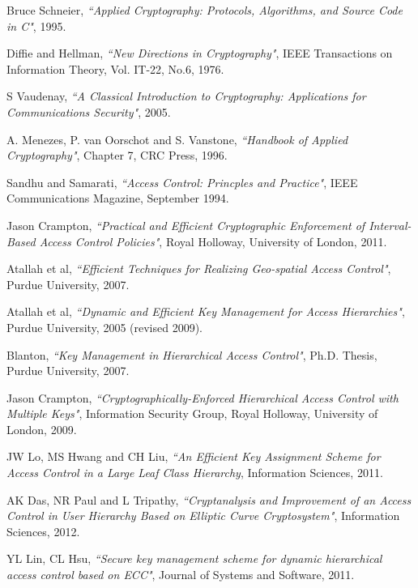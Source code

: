 \documentclass[12pt, titlepage]{article}
\begin{document}
\begin{thebibliography}{10}

Bruce Schneier, \emph{``Applied Cryptography: Protocols, Algorithms, and Source Code in C"}, 1995.

Diffie and Hellman, \emph{``New Directions in Cryptography"},
IEEE Transactions on Information Theory, Vol. IT-22, No.6, 1976.

S Vaudenay, \emph{``A Classical Introduction to Cryptography: Applications for Communications Security"}, 2005.

A. Menezes, P. van Oorschot and S. Vanstone, \emph{``Handbook of Applied Cryptography"}, Chapter 7, CRC Press, 1996.

Sandhu and Samarati, \emph{``Access Control: Princples and Practice"},
IEEE Communications Magazine, September 1994.

Jason Crampton, \emph{``Practical and Efficient Cryptographic Enforcement of Interval-Based
Access Control Policies"}, Royal Holloway, University of London, 2011.

Atallah et al, \emph{``Efficient Techniques for Realizing Geo-spatial Access Control"},  Purdue University, 2007.

Atallah et al, \emph{``Dynamic and Efficient Key Management for Access Hierarchies"}, Purdue University, 2005 (revised 2009).

Blanton, \emph{``Key Management in Hierarchical Access Control"}, Ph.D. Thesis, Purdue University, 2007.

Jason Crampton, \emph{``Cryptographically-Enforced Hierarchical
Access Control with Multiple Keys"}, Information Security Group, Royal Holloway, University of London, 2009.

JW Lo, MS Hwang and CH Liu, \emph{``An Efficient Key Assignment Scheme for Access Control in a Large Leaf Class Hierarchy}, Information Sciences, 2011.

AK Das, NR Paul and L Tripathy, \emph{``Cryptanalysis and Improvement of an Access Control in User Hierarchy Based on Elliptic Curve Cryptosystem"}, Information Sciences, 2012.

YL Lin, CL Hsu, \emph{``Secure key management scheme for dynamic hierarchical access control based on ECC"}, Journal of Systems and Software, 2011.


\end{thebibliography}
\end{document}
